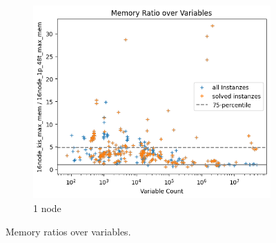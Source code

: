 \documentclass[12pt,a4paper,twoside]{scrartcl}
\numberwithin{equation}{section}
\begin{document}
\begin{figure}
\begin{subfigure}[c]{.4\textwidth}
    \center
    \includegraphics[scale=.3]{plots/16node_compare/mem_ratio_over_vars.png}
    \caption{1 node}
  \end{subfigure}
  \caption{Memory ratios over variables.}
  \label{fig:memRatiosVars}
\end{figure}
\end{document}
